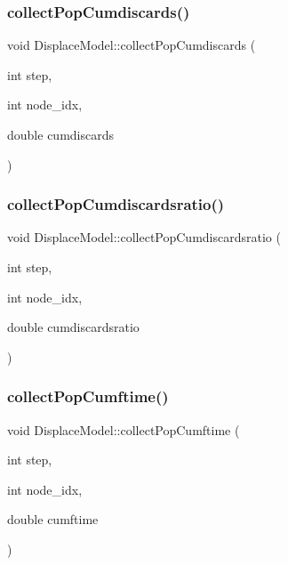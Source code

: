 \mbox{\label{class_displace_model_a1314535dd4affc28cafad84148883098}} 
\subsubsection{\texorpdfstring{collectPopCumdiscards()}{collectPopCumdiscards()}}
{\footnotesize\ttfamily void Displace\+Model\+::collect\+Pop\+Cumdiscards (\begin{DoxyParamCaption}\item[{int}]{step,  }\item[{int}]{node\+\_\+idx,  }\item[{double}]{cumdiscards }\end{DoxyParamCaption})}

\mbox{\label{class_displace_model_a9fd70426f04a4937e26e8de7f443e098}} 
\subsubsection{\texorpdfstring{collectPopCumdiscardsratio()}{collectPopCumdiscardsratio()}}
{\footnotesize\ttfamily void Displace\+Model\+::collect\+Pop\+Cumdiscardsratio (\begin{DoxyParamCaption}\item[{int}]{step,  }\item[{int}]{node\+\_\+idx,  }\item[{double}]{cumdiscardsratio }\end{DoxyParamCaption})}

\mbox{\label{class_displace_model_a305ddccded170343a3fde08dbf6e5883}} 
\subsubsection{\texorpdfstring{collectPopCumftime()}{collectPopCumftime()}}
{\footnotesize\ttfamily void Displace\+Model\+::collect\+Pop\+Cumftime (\begin{DoxyParamCaption}\item[{int}]{step,  }\item[{int}]{node\+\_\+idx,  }\item[{double}]{cumftime }\end{DoxyParamCaption})}

